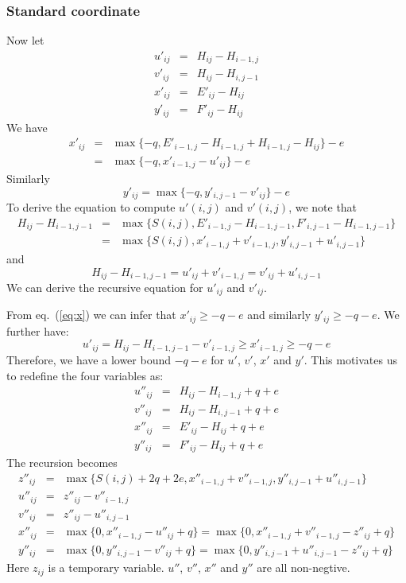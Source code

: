 \documentclass[10pt]{article}
\begin{document}
\subsubsection{Standard coordinate}
Now let
\begin{eqnarray*}
u'_{ij}&=&H_{ij}-H_{i-1,j}\\
v'_{ij}&=&H_{ij}-H_{i,j-1}\\
x'_{ij}&=&E'_{ij}-H_{ij}\\
y'_{ij}&=&F'_{ij}-H_{ij}
\end{eqnarray*}
We have
\begin{eqnarray}\label{eq:x}
x'_{ij}&=&\max\{-q,E'_{i-1,j}-H_{i-1,j}+H_{i-1,j}-H_{ij}\}-e\\\nonumber
&=&\max\{-q,x'_{i-1,j}-u'_{ij}\}-e
\end{eqnarray}
Similarly
\begin{equation}
y'_{ij}=\max\{-q,y'_{i,j-1}-v'_{ij}\}-e
\end{equation}
To derive the equation to compute $u'(i,j)$ and $v'(i,j)$, we note that
\begin{eqnarray*}
H_{ij}-H_{i-1,j-1}
&=&\max\{S(i,j),E'_{i-1,j}-H_{i-1,j-1},F'_{i,j-1}-H_{i-1,j-1}\}\\
&=&\max\{S(i,j),x'_{i-1,j}+v'_{i-1,j},y'_{i,j-1}+u'_{i,j-1}\}
\end{eqnarray*}
and
\[H_{ij}-H_{i-1,j-1}=u'_{ij}+v'_{i-1,j}=v'_{ij}+u'_{i,j-1}\]
We can derive the recursive equation for $u'_{ij}$ and $v'_{ij}$.

From eq.~(\ref{eq:x}) we can infer that $x'_{ij}\ge-q-e$ and similarly
$y'_{ij}\ge-q-e$. We further have:
\[
u'_{ij}=H_{ij}-H_{i-1,j-1}-v'_{i-1,j}\ge x'_{i-1,j}\ge-q-e
\]
Therefore, we have a lower bound $-q-e$ for $u'$, $v'$, $x'$ and $y'$.
This motivates us to redefine the four variables as:
\begin{eqnarray*}
u''_{ij}&=&H_{ij}-H_{i-1,j}+q+e\\
v''_{ij}&=&H_{ij}-H_{i,j-1}+q+e\\
x''_{ij}&=&E'_{ij}-H_{ij}+q+e\\
y''_{ij}&=&F'_{ij}-H_{ij}+q+e
\end{eqnarray*}
The recursion becomes
\begin{eqnarray*}
z''_{ij}&=&\max\{S(i,j)+2q+2e,x''_{i-1,j}+v''_{i-1,j},y''_{i,j-1}+u''_{i,j-1}\}\\
u''_{ij}&=&z''_{ij}-v''_{i-1,j}\\
v''_{ij}&=&z''_{ij}-u''_{i,j-1}\\
x''_{ij}&=&\max\{0,x''_{i-1,j}-u''_{ij}+q\}=\max\{0,x''_{i-1,j}+v''_{i-1,j}-z''_{ij}+q\}\\
y''_{ij}&=&\max\{0,y''_{i,j-1}-v''_{ij}+q\}=\max\{0,y''_{i,j-1}+u''_{i,j-1}-z''_{ij}+q\}
\end{eqnarray*}
Here $z_{ij}$ is a temporary variable. $u''$, $v''$, $x''$ and $y''$ are all
non-negtive.
\end{document}
